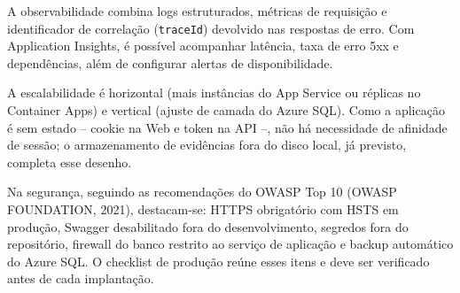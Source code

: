 A observabilidade combina logs estruturados, métricas de requisição e
identificador de correlação (\texttt{traceId}) devolvido nas respostas de erro.
Com Application Insights, é possível acompanhar latência, taxa de erro 5xx e
dependências, além de configurar alertas de disponibilidade.

A escalabilidade é horizontal (mais instâncias do App Service ou réplicas no
Container Apps) e vertical (ajuste de camada do Azure SQL). Como a aplicação é
sem estado -- cookie na Web e token na API --, não há necessidade de afinidade
de sessão; o armazenamento de evidências fora do disco local, já previsto,
completa esse desenho.

Na segurança, seguindo as recomendações do OWASP Top 10 (OWASP FOUNDATION,
2021), destacam-se: HTTPS obrigatório com HSTS em produção, Swagger
desabilitado fora do desenvolvimento, segredos fora do repositório, firewall do
banco restrito ao serviço de aplicação e backup automático do Azure SQL. O
checklist de produção reúne esses itens e deve ser verificado antes de cada
implantação.
